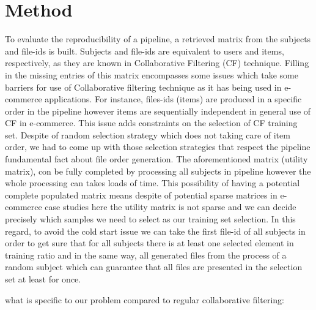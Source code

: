 \documentclass[10pt, conference, compsocconf]{IEEEtran}
\begin{document}
\section{Method}

To evaluate the reproducibility of a pipeline, a retrieved matrix from 
the subjects and file-ids is built. Subjects and file-ids are equivalent 
to users and items, respectively, as they are known in Collaborative Filtering (CF) technique.
Filling in the missing entries of this matrix encompasses some issues 
which take some barriers for use of Collaborative filtering technique as it 
has being used in e-commerce applications.
For instance, files-ids (items) are produced in a specific order in the 
pipeline however items are sequentially independent in general use of CF in e-commerce.
This issue adds constraints on the selection of CF training set. Despite of random 
selection strategy which does not taking care of item order, we had to come up with those 
selection strategies that respect the pipeline fundamental fact about file order generation.  
The aforementioned matrix (utility matrix), con be fully completed by processing all subjects 
in pipeline however the whole processing can takes loads of time. This possibility of 
having a potential complete populated matrix means despite of potential sparse matrices 
in e-commerce case studies here the utility matrix is not sparse and 
we can decide precisely which samples we need to select as our training set selection. 
In this regard, to avoid the cold start issue we can take the first file-id of all 
subjects in order to get sure that for all subjects there is at least one 
selected element in training ratio and in the same way, all generated files 
from the process of a random subject which can guarantee that all files 
are presented in the selection set at least for once. 
 

 
what is specific to our problem compared to regular collaborative filtering:
\end{document}
